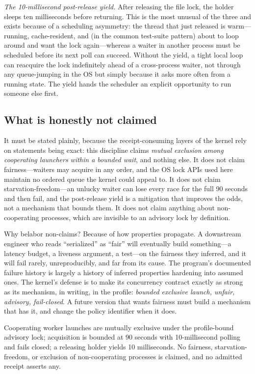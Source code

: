 \emph{The 10-millisecond post-release yield.} After releasing the file lock, the holder sleeps ten milliseconds before returning. This is the most unusual of the three and exists because of a scheduling asymmetry: the thread that just released is warm---running, cache-resident, and (in the common test-suite pattern) about to loop around and want the lock again---whereas a waiter in another process must be scheduled before its next poll can succeed. Without the yield, a tight local loop can reacquire the lock indefinitely ahead of a cross-process waiter, not through any queue-jumping in the OS but simply because it asks more often from a running state. The yield hands the scheduler an explicit opportunity to run someone else first.

\subsection{What is honestly not claimed}\label{ch08:no-fairness}

It must be stated plainly, because the receipt-consuming layers of the kernel rely on statements being exact: this discipline claims \emph{mutual exclusion among cooperating launchers within a bounded wait}, and nothing else. It does not claim fairness---waiters may acquire in any order, and the OS lock APIs used here maintain no ordered queue the kernel could appeal to. It does not claim starvation-freedom---an unlucky waiter can lose every race for the full 90 seconds and then fail, and the post-release yield is a mitigation that improves the odds, not a mechanism that bounds them. It does not claim anything about non-cooperating processes, which are invisible to an advisory lock by definition.

Why belabor non-claims? Because of how properties propagate. A downstream engineer who reads ``serialized'' as ``fair'' will eventually build something---a latency budget, a liveness argument, a test---on the fairness they inferred, and it will fail rarely, unreproducibly, and far from its cause. The program's documented failure history is largely a history of inferred properties hardening into assumed ones. The kernel's defense is to make its concurrency contract exactly as strong as its mechanism, in writing, in the profile: \emph{bounded exclusive launch, unfair, advisory, fail-closed}. A future version that wants fairness must build a mechanism that has it, and change the policy identifier when it does.

\begin{ruleenv}\label{ch08:rule:contract}
Cooperating worker launches are mutually exclusive under the profile-bound advisory lock; acquisition is bounded at 90 seconds with 10-millisecond polling and fails closed; a releasing holder yields 10 milliseconds. No fairness, starvation-freedom, or exclusion of non-cooperating processes is claimed, and no admitted receipt asserts any.
\end{ruleenv}

